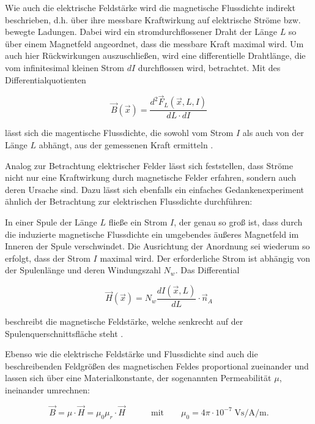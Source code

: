 Wie auch die elektrische Feldstärke wird die magnetische Flussdichte indirekt beschrieben, d.h. über ihre messbare Kraftwirkung auf elektrische Ströme bzw. bewegte Ladungen. Dabei wird ein stromdurchflossener Draht der Länge $L$ so über einem Magnetfeld angeordnet, dass die messbare Kraft maximal wird. Um auch hier Rückwirkungen auszuschließen, wird eine differentielle Drahtlänge, die vom infinitesimal kleinen Strom $dI$ durchflossen wird, betrachtet. Mit des Differentialquotienten

\begin{equation}
    \vec B(\vec x) = \frac{d^2 \vec F_L(\vec x,L,I)}{dL \cdot dI}
\end{equation}

lässt sich die magentische Flussdichte, die sowohl vom Strom $I$ als auch von der Länge $L$ abhängt, aus der gemessenen Kraft ermitteln \cite{EM_Schirmung}. 
\par
\vspace{\linespace}
Analog zur Betrachtung elektrischer Felder lässt sich feststellen, dass Ströme nicht nur eine Kraftwirkung durch magnetische Felder erfahren, sondern auch deren Ursache sind. Dazu lässt sich ebenfalls ein einfaches Gedankenexperiment ähnlich der Betrachtung zur elektrischen Flussdichte durchführen: 
\par
\vspace{\linespace}
In einer Spule der Länge $L$ fließe ein Strom $I$, der genau so groß ist, dass durch die induzierte magnetische Flussdichte ein umgebendes äußeres Magnetfeld im Inneren der Spule verschwindet. Die Ausrichtung der Anordnung sei wiederum so erfolgt, dass der Strom $I$ maximal wird. Der erforderliche Strom ist abhängig von der Spulenlänge und deren Windungszahl $N_w$. Das Differential

\begin{equation}
    \vec H(\vec x) = N_w \frac{dI(\vec x,L)}{dL} \cdot \vec n_A
\end{equation}

beschreibt die magnetische Feldstärke, welche senkrecht auf der Spulenquerschnittsfläche steht \cite{EM_Schirmung}. 
\par
\vspace{\linespace}
Ebenso wie die elektrische Feldstärke und Flussdichte sind auch die beschreibenden Feldgrößen des magnetischen Feldes proportional zueinander und lassen sich über eine Materialkonstante, der sogenannten Permeabilität $\mu$, ineinander umrechnen:

\begin{equation}
    \vec B = \mu \cdot \vec H = \mu_0 \mu_r \cdot \vec H \qquad \quad \text{mit} \qquad \mu_0 = 4 \pi \cdot 10^{-7} \; \si{\volt\second\per\ampere\per\meter}.
    \label{eq:2_Materialgleichung_magnetisches_Feld}
\end{equation}

